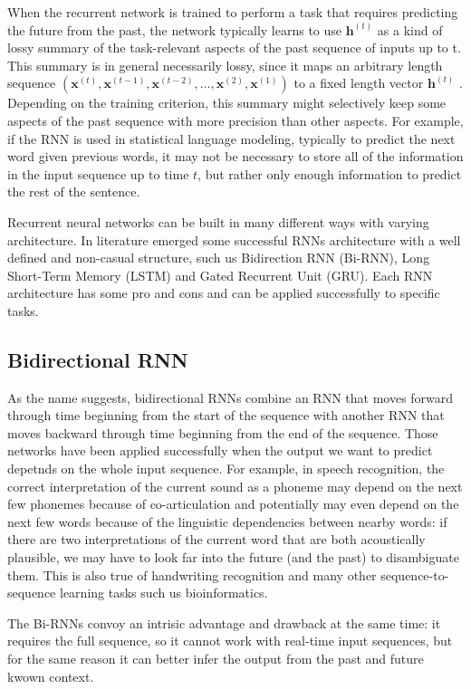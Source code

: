 When the recurrent network is trained to perform a task that requires
predicting the future from the past, the network typically learns to
use $\bm{h}^{(t)}$ as a kind of lossy summary of the task-relevant
aspects of the past sequence of inputs up to t. This summary is in
general necessarily lossy, since it maps an arbitrary length sequence
$( \bm{x}^{(t)}, \bm{x}^{(t-1)}, \bm{x}^{(t-2)} , \ldots ,
\bm{x}^{(2)}, \bm{x}^{(1)} )$ to a ﬁxed length vector $\bm{h}^{(t)}$ .
Depending on the training criterion, this summary might selectively
keep some aspects of the past sequence with more precision than other
aspects. For example, if the RNN is used in statistical language
modeling, typically to predict the next word given previous words, it
may not be necessary to store all of the information in the input
sequence up to time $t$, but rather only enough information to predict
the rest of the sentence.

Recurrent neural networks can be built in many diﬀerent ways with
varying architecture. In literature emerged some successful RNNs
architecture with a well defined and non-casual structure, such us
Bidirection RNN (Bi-RNN), Long Short-Term Memory (LSTM) and Gated
Recurrent Unit (GRU). Each RNN architecture has some pro and cons and
can be applied successfully to specific tasks.

\subsection{Bidirectional RNN}

As the name suggests, bidirectional RNNs combine an RNN that moves
forward through time beginning from the start of the sequence with
another RNN that moves backward through time beginning from the end of
the sequence. Those networks have been applied successfully when the
output we want to predict depetnds on the whole input sequence. For
example, in speech recognition, the correct interpretation of the
current sound as a phoneme may depend on the next few phonemes because
of co-articulation and potentially may even depend on the next few
words because of the linguistic dependencies between nearby words: if
there are two interpretations of the current word that are both
acoustically plausible, we may have to look far into the future (and
the past) to disambiguate them. This is also true of handwriting
recognition and many other sequence-to-sequence learning tasks such us
bioinformatics.

The Bi-RNNs convoy an intrisic advantage and drawback at the same
time: it requires the full sequence, so it cannot work with real-time
input sequences, but for the same reason it can better infer the
output from the past and future kwown context.

